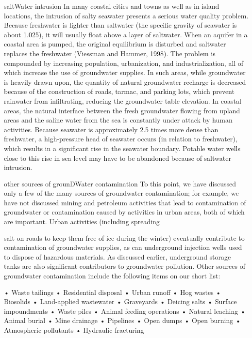 \documentclass{article}
\begin{document}
saltWater intrusion In many coastal cities and towns as well as in
island locations, the intrusion of salty seawater presents a serious
water quality problem. Because freshwater is lighter than saltwater (the
specific gravity of seawater is about 1.025), it will usually float
above a layer of saltwater. When an aquifer in a coastal area is pumped,
the original equilibrium is disturbed and saltwater replaces the
freshwater (Viessman and Hammer, 1998). The problem is compounded by
increasing population, urbanization, and industrialization, all of which
increase the use of groundwater supplies. In such areas, while
groundwater is heavily drawn upon, the quantity of natural groundwater
recharge is decreased because of the construction of roads, tarmac, and
parking lots, which prevent rainwater from infiltrating, reducing the
groundwater table elevation. In coastal areas, the natural interface
between the fresh groundwater flowing from upland areas and the saline
water from the sea is constantly under attack by human activities.
Because seawater is approximately 2.5 times more dense than freshwater,
a high-pressure head of seawater occurs (in relation to freshwater),
which results in a significant rise in the seawater boundary. Potable
water wells close to this rise in sea level may have to be abandoned
because of saltwater intrusion.

other sources of grounDWater contamination To this point, we have
discussed only a few of the many sources of groundwater contamination;
for example, we have not discussed mining and petroleum activities that
lead to contamination of groundwater or contamination caused by
activities in urban areas, both of which are important. Urban activities
(including spreading

salt on roads to keep them free of ice during the winter) eventually
contribute to contamination of groundwater supplies, as can underground
injection wells used to dispose of hazardous materials. As discussed
earlier, underground storage tanks are also significant contributors to
groundwater pollution. Other sources of groundwater contamination
include the following items on our short list:

• Waste tailings • Residential disposal • Urban runoff • Hog wastes •
Biosolids • Land-applied wastewater • Graveyards • Deicing salts •
Surface impoundments • Waste piles • Animal feeding operations • Natural
leaching • Animal burial • Mine drainage • Pipelines • Open dumps • Open
burning • Atmospheric pollutants • Hydraulic fracturing
\end{document}
